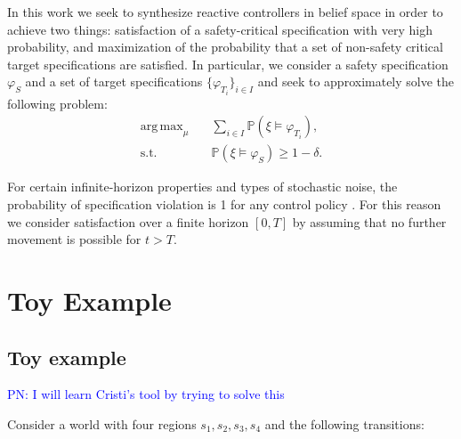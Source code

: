 \documentclass[conference]{IEEEtran}
\DeclareMathOperator*{\argmax}{arg\,max}
\begin{document}
In this work we seek to synthesize reactive controllers in belief space in order to achieve two things: satisfaction of a safety-critical specification with very high probability, and maximization of the probability that a set of non-safety critical target specifications are satisfied. In particular, we consider a safety specification $\varphi_S$ and a set of target specifications $\{ \varphi_{T_i} \}_{i \in I}$ and seek to approximately solve the following problem:
\begin{equation}
\begin{aligned}
  \argmax_{\mu} & \quad  \sum_{i \in I} \mathbb{P} \left( \xi \models \varphi_{T_i} \right), \\ 
  \text{s.t.} &\quad   \mathbb{P} \left( \xi \models \varphi_S \right) \geq 1 - \delta.
\end{aligned}
\end{equation}


For certain infinite-horizon properties and types of stochastic noise, the probability of specification violation is 1 for any control policy \cite{Ehlers2016}. For this reason we consider satisfaction over a finite horizon $[0, T]$ by assuming that no further movement is possible for $t > T$.


\section{Toy Example}

\subsection{Toy example}

\textcolor{blue}{PN: I will learn Cristi's tool by trying to solve this}

Consider a world with four regions $s_1, s_2, s_3, s_4$ and the following transitions:

\begin{center}
\end{center}
\end{document}
